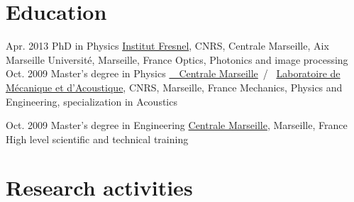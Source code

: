 \documentclass{cv}
\begin{document}
\section{Education}

\begin{entrylist}
	\entry
	{Apr. 2013}
	{PhD {\normalfont in Physics}}
	{\href{http://www.fresnel.fr/}{Institut Fresnel}, CNRS, Centrale Marseille, Aix Marseille Universit\'e, Marseille, France}
	{Optics, Photonics and image processing}
	\entry
	{Oct. 2009}
	{Master's degree {\normalfont in Physics}}
	{\href{http://www.centrale-marseille.fr/}{~~Centrale Marseille}~/~
		\href{http://www.lma.cnrs-mrs.fr/}{Laboratoire de Mécanique et d'Acoustique}, CNRS, Marseille, France}
	{Mechanics, Physics and Engineering, specialization in Acoustics}

	\entry
	{Oct. 2009}
	{Master's degree {\normalfont in Engineering}}
	{\href{http://www.centrale-marseille.fr/}{Centrale Marseille}, Marseille, France}
	{High level scientific and technical training}
\end{entrylist}

\vspace*{-0.2cm}
\section{Research activities}
\end{document}
